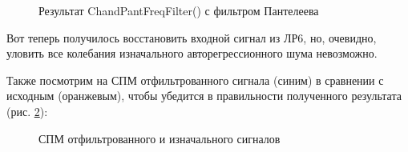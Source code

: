 \documentclass[a4paper,oneside,14pt]{extreport}
\begin{document}
\begin{figure}[!h]
	\caption{Результат ChandPantFreqFilter() с фильтром Пантелеева}
	\label{task5}
\end{figure}

\newpage
Вот теперь получилось восстановить входной сигнал из ЛР6, но, очевидно, уловить все колебания изначального авторегрессионного шума невозможно.

Также посмотрим на СПМ отфильтрованного сигнала (синим) в сравнении с исходным (оранжевым), чтобы убедится в правильности полученного результата (рис. \ref{task5_spectr}):

\begin{figure}[!h]
	\caption{СПМ отфильтрованного и изначального сигналов}
	\label{task5_spectr}
\end{figure}
\end{document}
